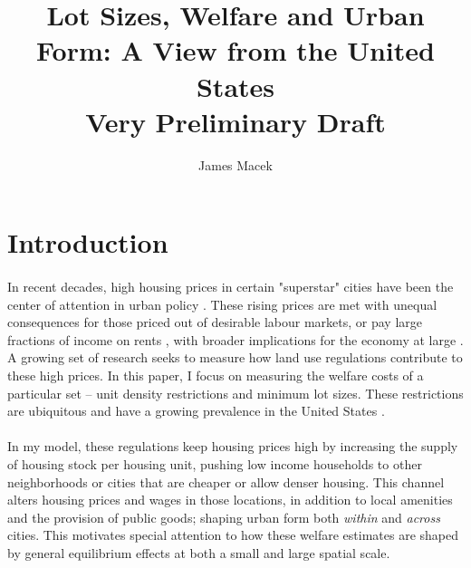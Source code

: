 \documentclass[]{article}
\title{Lot Sizes, Welfare and Urban Form: A View from the United States \\
Very Preliminary Draft}
\author{James Macek}
\begin{document}
\maketitle

\section{Introduction}
\paragraph*{}
In recent decades, high housing prices in certain "superstar" cities have been the center of attention in urban policy \citep{superstarcities}. These rising prices are met with unequal consequences for those priced out of desirable labour markets, or pay large fractions of income on rents \citep{albouyetal}, with broader implications for the economy at large \citep{hseihmoretti} \citep{parkho}. A growing set of research seeks to measure how land use regulations contribute to these high prices. In this paper, I focus on measuring the welfare costs of a particular set -- unit density restrictions and minimum lot sizes. These restrictions are ubiquitous and have a growing prevalence in the United States \citep{gyourko2021}.  
\paragraph*{}

 In my model, these regulations keep housing prices high by increasing the supply of housing stock per housing unit, pushing low income  households to other neighborhoods or cities that are cheaper or allow denser housing. This channel alters housing prices and wages in those locations, in addition to local amenities and the provision of public goods; shaping urban form both \textit{within} and \textit{across} cities. This motivates special attention to how these welfare estimates are shaped by general equilibrium effects at both a small and large spatial scale.
 
\end{document}
